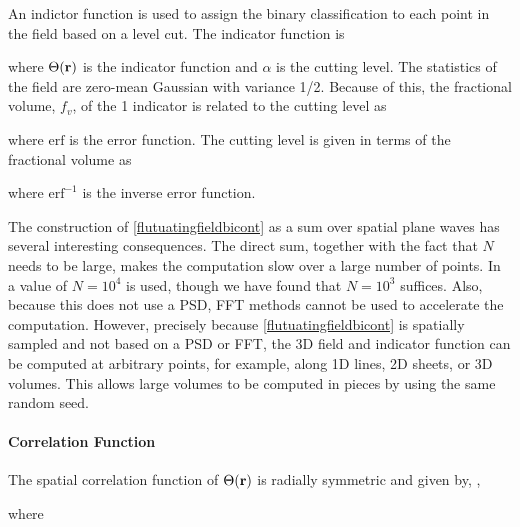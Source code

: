An indictor function is used to assign the binary classification to each point in the field based on a level cut. The indicator function is 

\noindent where $\Theta(\mathbf{r})$ is the indicator function and $\alpha$ is the cutting level.  The statistics of the field are zero-mean Gaussian with variance 1/2. Because of this, the fractional volume, $f_v$, of the 1 indicator is related to the cutting level as 

\noindent where $\textrm{erf}$ is the error function.  The cutting level is given in terms of the fractional volume as 

\noindent where $\textrm{erf}^{-1}$ is the inverse error function.

The construction of \eqref{flutuatingfieldbicont} as a sum over spatial plane waves has several interesting consequences. The direct sum, together with the fact that $N$ needs to be large, makes the computation slow over a large number of points. In \cite{ding2010electromagnetic} a value of $N = 10^4$ is used, though we have found that $N=10^3$ suffices. Also, because this does not use a PSD, FFT methods cannot be used to accelerate the computation. However, precisely because \eqref{flutuatingfieldbicont} is spatially sampled and not based on a PSD or FFT, the 3D field and indicator function can be computed at arbitrary points, for example, along 1D lines, 2D sheets, or 3D volumes. This allows large volumes to be computed in pieces by using the same random seed.

\newpage 
\paragraph{Correlation Function}

The spatial correlation function of $\Theta(\mathbf{r})$ is radially symmetric and given by, \cite{ding2010electromagnetic}, 

\noindent where 

